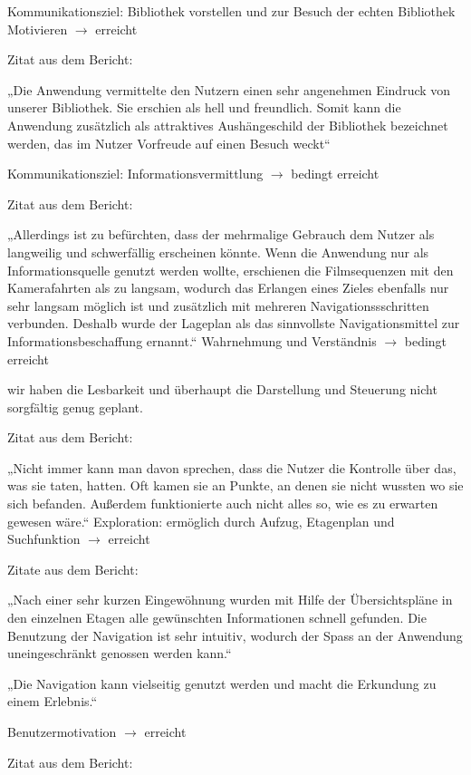 Kommunikationsziel: Bibliothek vorstellen und zur Besuch der echten Bibliothek Motivieren $\to$ erreicht

Zitat aus dem Bericht: 

„Die Anwendung vermittelte den Nutzern einen sehr angenehmen Eindruck von unserer Bibliothek. Sie erschien als hell und freundlich. Somit kann die Anwendung zusätzlich als attraktives Aushängeschild der Bibliothek bezeichnet werden, das im Nutzer Vorfreude auf einen Besuch weckt“\bigskip

Kommunikationsziel: Informationsvermittlung $\to$ bedingt erreicht

Zitat aus dem Bericht:

„Allerdings ist zu befürchten, dass der mehrmalige Gebrauch dem
Nutzer als langweilig und schwerfällig erscheinen könnte. 
Wenn die Anwendung nur als Informationsquelle genutzt werden wollte, erschienen die Filmsequenzen mit den Kamerafahrten als zu langsam, wodurch das Erlangen eines Zieles ebenfalls nur sehr langsam möglich ist und zusätzlich mit mehreren Navigationssschritten verbunden. Deshalb wurde der Lageplan als das sinnvollste Navigationsmittel zur Informationsbeschaffung ernannt.“
Wahrnehmung und Verständnis $\to$ bedingt erreicht

wir haben die Lesbarkeit und überhaupt die Darstellung und Steuerung nicht sorgfältig genug geplant.

Zitat aus dem Bericht: 

„Nicht immer kann man davon sprechen, dass die Nutzer die Kontrolle über das, was sie taten, hatten. Oft kamen sie an Punkte, an denen sie nicht wussten wo sie sich befanden. Außerdem funktionierte auch nicht alles so, wie es zu erwarten gewesen wäre.“
Exploration: ermöglich durch Aufzug, Etagenplan und Suchfunktion $\to$ erreicht

Zitate aus dem Bericht:

„Nach einer sehr kurzen Eingewöhnung wurden mit Hilfe der Übersichtspläne in den einzelnen Etagen alle gewünschten Informationen schnell gefunden. Die Benutzung der Navigation ist sehr intuitiv, wodurch der Spass an der Anwendung uneingeschränkt genossen werden kann.“

„Die Navigation kann vielseitig genutzt werden und macht die Erkundung zu einem Erlebnis.“

Benutzermotivation $\to$ erreicht

Zitat aus dem Bericht:


